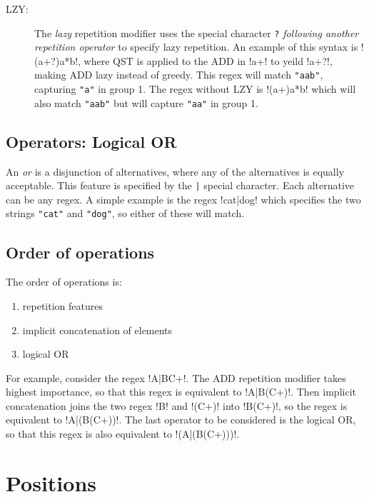 \begin{description}
\item[LZY:] The \emph{lazy} repetition modifier uses the special character \verb!?! \emph{following another repetition operator} to specify lazy repetition.  An example of this syntax is \cverb!(a+?)a*b!, where QST is applied to the ADD in \cverb!a+! to yeild \cverb!a+?!, making ADD lazy instead of greedy.  This regex will match \verb!"aab"!, capturing \verb!"a"! in group 1.  The regex without LZY is \cverb!(a+)a*b! which will also match \verb!"aab"! but will capture \verb!"aa"! in group 1.
\end{description}

\subsection*{Operators: Logical OR}
\begin{description} \itemsep -1pt
\item[OR:] An \emph{or} is a disjunction of alternatives, where any of the alternatives is equally acceptable.  This feature is specified by the \verb!|! special character.  Each alternative can be any regex.  A simple example is the regex \cverb!cat|dog! which specifies the two strings \verb!"cat"! and \verb!"dog"!, so either of these will match.
\end{description}

\subsection*{Order of operations}
\label{sec:orderOfOperations}
The order of operations is:
\begin{enumerate}\itemsep -1pt
\item repetition features
\item implicit concatenation of elements
\item logical OR
\end{enumerate}
For example, consider the regex \cverb!A|BC+!.  The ADD repetition modifier takes highest importance, so that this regex is equivalent to \cverb!A|B(C+)!.  Then implicit concatenation joins the two regex \cverb!B! and \cverb!(C+)! into \cverb!B(C+)!, so the regex is equivalent to \cverb!A|(B(C+))!.  The last operator to be considered is the logical OR, so that this regex is also equivalent to \cverb!(A|(B(C+)))!.

\section*{Positions}

